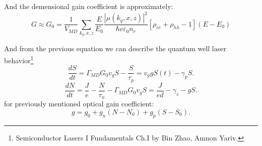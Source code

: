 And the demensional gain coefficient is approximately:
\begin{equation}
	G \approx G_0 = \frac{1}{V_{MD}} \sum_{k_q, x, z} \frac{E}{E_0} \frac{|\mu(k_q, x, z)|^2}{\hbar c \varepsilon_0 n_r}[\rho_{ee} + \rho_{hh} - 1] (E - E_0)
\end{equation}

And from the previous equation we can describe the quantum well laser behavior\footnote{
    Semiconductor
Lasers I
Fundamentals Ch.I by Bin Zhao, Amnon Yariv.
}
\begin{equation*}
	\frac{d S}{d t} = \Gamma_{MD} G_0 v_g S - \frac{S}{\tau_p} = v_g g S(t) - \gamma_p S. 
\end{equation*}
\begin{equation*}
	\frac{d N}{d t} = \frac{J}{e} - \frac{N}{\tau_n} - \Gamma_{MD} G_0 v_g S = \frac{J}{e d} - \gamma_s - g S.
\end{equation*}
for previously mentioned optical gain coefficient:
\begin{equation*}
	g = g_0 + g_n(N-N_0) + g_p(S - S_0).
\end{equation*}